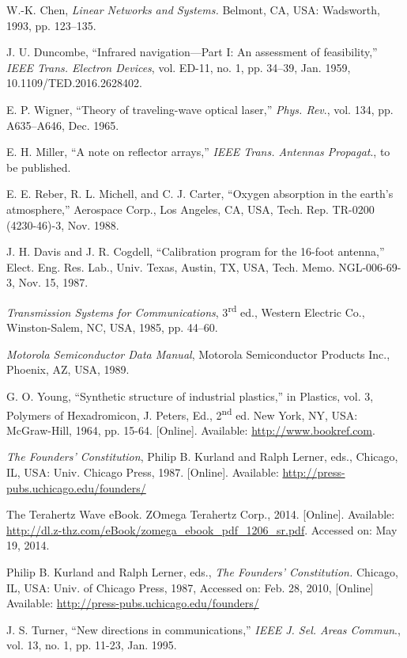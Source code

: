 \documentclass{ieeeaccess}
\begin{document}
\begin{thebibliography}{00}
 W.-K. Chen, \emph{Linear Networks and Systems.} Belmont, CA, USA: Wadsworth, 1993, pp. 123--135.

 J. U. Duncombe, ``Infrared navigation---Part I: An assessment of feasibility,'' \emph{IEEE Trans. Electron Devices}, vol. ED-11, no. 1, pp. 34--39, Jan. 1959, 10.1109/TED.2016.2628402.

 E. P. Wigner, ``Theory of traveling-wave optical laser,'' \emph{Phys. Rev}., vol. 134, pp. A635--A646, Dec. 1965.

 E. H. Miller, ``A note on reflector arrays,'' \emph{IEEE Trans. Antennas Propagat}., to be published.

 E. E. Reber, R. L. Michell, and C. J. Carter, ``Oxygen absorption in the earth's atmosphere,'' Aerospace Corp., Los Angeles, CA, USA, Tech. Rep. TR-0200 (4230-46)-3, Nov. 1988.

 J. H. Davis and J. R. Cogdell, ``Calibration program for the 16-foot antenna,'' Elect. Eng. Res. Lab., Univ. Texas, Austin, TX, USA, Tech. Memo. NGL-006-69-3, Nov. 15, 1987.

 \emph{Transmission Systems for Communications}, 3\textsuperscript{rd} ed., Western Electric Co., Winston-Salem, NC, USA, 1985, pp. 44--60.

 \emph{Motorola Semiconductor Data Manual}, Motorola Semiconductor Products Inc., Phoenix, AZ, USA, 1989.

 G. O. Young, ``Synthetic structure of industrial
plastics,'' in Plastics, vol. 3, Polymers of Hexadromicon, J. Peters,
Ed., 2\textsuperscript{nd} ed. New York, NY, USA: McGraw-Hill, 1964, pp. 15-64.
[Online]. Available:
\underline{http://www.bookref.com}.

 \emph{The Founders' Constitution}, Philip B. Kurland
and Ralph Lerner, eds., Chicago, IL, USA: Univ. Chicago Press, 1987.
[Online]. Available: \underline{http://press-pubs.uchicago.edu/founders/}

 The Terahertz Wave eBook. ZOmega Terahertz Corp., 2014.
[Online]. Available:
\underline{http://dl.z-thz.com/eBook/zomega\_ebook\_pdf\_1206\_sr.pdf}. Accessed on: May 19, 2014.

 Philip B. Kurland and Ralph Lerner, eds., \emph{The
Founders' Constitution.} Chicago, IL, USA: Univ. of Chicago Press,
1987, Accessed on: Feb. 28, 2010, [Online] Available:
\underline{http://press-pubs.uchicago.edu/founders/}

 J. S. Turner, ``New directions in communications,'' \emph{IEEE J. Sel. Areas Commun}., vol. 13, no. 1, pp. 11-23, Jan. 1995.


\end{thebibliography}
\end{document}
